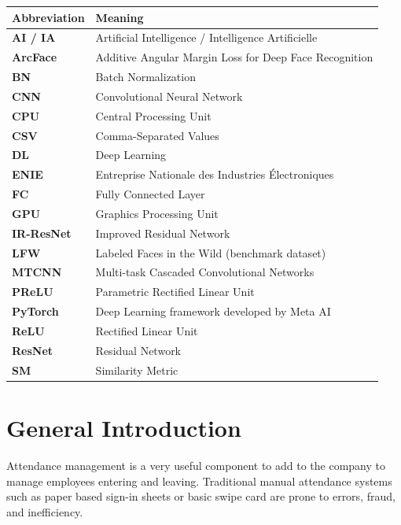 \documentclass[sommairechap,stylejchiquet]{these_gi}
\begin{document}
\begin{center}
\begin{tabular}{|l|p{10cm}|}
\hline
\textbf{Abbreviation} & \textbf{Meaning} \\
\hline
\textbf{AI / IA} & Artificial Intelligence / Intelligence Artificielle \\
\hline
\textbf{ArcFace} & Additive Angular Margin Loss for Deep Face Recognition \\
\hline
\textbf{BN} & Batch Normalization \\
\hline
\textbf{CNN} & Convolutional Neural Network \\
\hline
\textbf{CPU} & Central Processing Unit \\
\hline
\textbf{CSV} & Comma-Separated Values \\
\hline
\textbf{DL} & Deep Learning \\
\hline
\textbf{ENIE} & Entreprise Nationale des Industries Électroniques \\
\hline
\textbf{FC} & Fully Connected Layer \\
\hline
\textbf{GPU} & Graphics Processing Unit \\
\hline
\textbf{IR-ResNet} & Improved Residual Network \\
\hline
\textbf{LFW} & Labeled Faces in the Wild (benchmark dataset) \\
\hline
\textbf{MTCNN} & Multi-task Cascaded Convolutional Networks \\
\hline
\textbf{PReLU} & Parametric Rectified Linear Unit \\
\hline
\textbf{PyTorch} & Deep Learning framework developed by Meta AI \\
\hline
\textbf{ReLU} & Rectified Linear Unit \\
\hline
\textbf{ResNet} & Residual Network \\
\hline
\textbf{SM} & Similarity Metric \\
\hline
\end{tabular}
\end{center}

\newpage

\section{General Introduction}
Attendance management is a very useful component to add to the company to manage employees entering and leaving. Traditional manual attendance systems such as paper based sign-in sheets or basic swipe card are prone to errors, fraud, and inefficiency.
\end{document}
